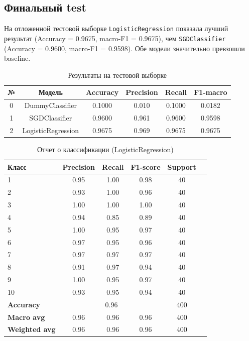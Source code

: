 \documentclass[oneside,a4paper,14pt]{extarticle}
\begin{document}
\newpage

\subsection{Финальный test}
На отложенной тестовой выборке \texttt{LogisticRegression} показала лучший результат (Accuracy = 0.9675, macro-F1 = 0.9675), чем \texttt{SGDClassifier} (Accuracy = 0.9600, macro-F1 = 0.9598). Обе модели значительно превзошли baseline.

\begin{table}[ht]
\centering
\begin{tabular}{cccccc}
\toprule
№ & Модель & Accuracy & Precision & Recall & F1-macro \\
\midrule
0 & DummyClassifier & 0.1000 & 0.010 & 0.1000 & 0.0182 \\
1 & SGDClassifier & 0.9600 & 0.961 & 0.9600 & 0.9598 \\
2 & LogisticRegression & 0.9675 & 0.969 & 0.9675 & 0.9675 \\
\bottomrule
\end{tabular}
\caption{Результаты на тестовой выборке}

\end{table}

\begin{table}[ht]
\centering
\begin{tabular}{lccccc}
\toprule
Класс & Precision & Recall & F1-score & Support \\
\midrule
1 & 0.95 & 1.00 & 0.98 & 40 \\
2 & 0.93 & 1.00 & 0.96 & 40 \\
3 & 1.00 & 1.00 & 1.00 & 40 \\
4 & 0.94 & 0.85 & 0.89 & 40 \\
5 & 1.00 & 0.95 & 0.97 & 40 \\
6 & 0.97 & 0.95 & 0.96 & 40 \\
7 & 0.97 & 0.97 & 0.97 & 40 \\
8 & 0.91 & 0.97 & 0.94 & 40 \\
9 & 1.00 & 0.95 & 0.97 & 40 \\
10 & 0.93 & 0.95 & 0.94 & 40 \\
\midrule
\textbf{Accuracy} & \multicolumn{3}{c}{0.96} & 400 \\
\textbf{Macro avg} & 0.96 & 0.96 & 0.96 & 400 \\
\textbf{Weighted avg} & 0.96 & 0.96 & 0.96 & 400 \\
\bottomrule
\end{tabular}
\caption{Отчет о классификации (LogisticRegression)}

\end{table}
\end{document}
